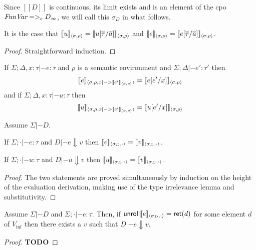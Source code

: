 \documentclass[preprint,nocopyrightspace]{sigplanconf}
\begin{document}
Since $[\![D]\!]$ is continuous, its limit exists and is an element of the cpo $\textit{FunVar} =>_c D_{\infty}$, 
we will call this $\sigma_{D}$ in what follows.

\begin{lemma}
It is the case that $[\![u]\!]_{\langle {\sigma},{\rho}\rangle} = [\![u[\overline{\tau}/\overline{a}]]\!]_{\langle {\sigma},{\rho}\rangle}$ 
and $[\![e]\!]_{\langle {\sigma},{\rho}\rangle} = [\![e[\overline{\tau}/\overline{a}]]\!]_{\langle {\sigma},{\rho}\rangle}$.
\end{lemma}
\begin{proof} Straightforward induction. \end{proof}

\begin{lemma}[Substitutivity]
If $\Sigma;\Delta,x{:}\tau |- e : \tau$ and $\rho$ is a semantic environment 
and $\Sigma;\Delta |- e' : \tau'$ then 
\[ [\![e]\!]_{\langle {\sigma},{\rho,x |-> [\![e']\!]_{\langle {\sigma},{\rho}\rangle}}\rangle} = [\![e[e'/x]]\!]_{\langle {\sigma},{\rho}\rangle} \]
and if $\Sigma;\Delta,x{:}\tau |- u : \tau$ then 
\[ [\![u]\!]_{\langle {\sigma},{\rho,x |-> [\![e']\!]_{\langle {\sigma},{\rho}\rangle}}\rangle} = [\![u[e'/x]]\!]_{\langle {\sigma},{\rho}\rangle} \]
\end{lemma}

\begin{lemma}
Assume $\Sigma |- D$. 
\begin{itemize*} 
  \item If $\Sigma;\cdot |- e : \tau$ and $D |- e \Downarrow v$ then $[\![e]\!]_{\langle {\sigma_{D}},{\cdot}\rangle} = [\![v]\!]_{\langle {\sigma_{D}},{\cdot}\rangle}$.
  \item If $\Sigma;\cdot |- u : \tau$ and $D |- u \Downarrow v$ then $[\![u]\!]_{\langle {\sigma_{D}},{\cdot}\rangle} = [\![v]\!]_{\langle {\sigma_{D}},{\cdot}\rangle}$.
\end{itemize*} 
\end{lemma} 
\begin{proof} The two statements are proved simultaneously by induction on the height of the evaluation derivation, making use
of the type irrelevance lemma and substitutivity.
\end{proof}

\begin{lemma}
Assume $\Sigma |- D$ and $\Sigma;\cdot |- e : \tau$. Then, 
if $\mathsf{unroll} [\![e]\!]_{\langle {\sigma_D},{\cdot}\rangle} = \mathsf{ret}(d)$ for some 
element $d$ of $V_{\inf}$ then there exists a $v$ such 
that $D |- e \Downarrow v$.
\end{lemma}

\begin{proof} {\bf TODO} \end{proof}
\end{document}
